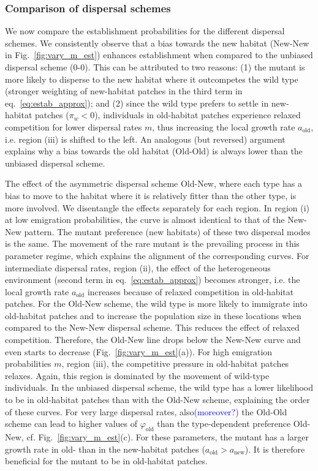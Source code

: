 \documentclass[11pt]{article}
\newcommand{\francois}[1]{\textcolor{blue}{(#1)}}
\newcommand{\chg}[1]{\textcolor{change}{#1}}
\begin{document}
\subsubsection*{Comparison of dispersal schemes}

We now compare the establishment probabilities for the different dispersal schemes. 
We consistently observe that \chg{a bias towards the new habitat (New-New} in Fig.~\ref{fig:vary_m_est}) enhances establishment when compared to the \chg{unbiased} dispersal scheme (0-0). This can be attributed to two reasons: (1) the mutant is more likely to disperse to the new habitat where it outcompetes the wild type (stronger weighting of new-habitat patches in the third term in eq.~\eqref{eq:estab_approx}); and (2) since the wild type prefers to settle in new-habitat patches ($\pi_w<0$), individuals in old-habitat patches experience relaxed competition for lower dispersal rates $m$, thus increasing the local growth rate $a_{\text{old}}$, i.e. region (iii) is shifted to the left. An analogous (but reversed) argument explains why \chg{a bias towards the old habitat (Old-Old}) is always lower than the \chg{unbiased} dispersal scheme. 

The effect of \chg{the asymmetric dispersal scheme Old-New}, where each type has a bias to move to the habitat where it is relatively fitter than the other type, is more involved. We disentangle the effects separately for each region. In region (i) at low emigration probabilities, the curve is almost identical to that of the \chg{New-New} pattern. The mutant preference \chg{(new habitats)} of these two dispersal modes is the same. The movement of the rare mutant is the prevailing process in this parameter regime, which explains the alignment of the \chg{corresponding} curves. 
For intermediate dispersal rates, region (ii), the effect of the heterogeneous environment (second term in eq.~\eqref{eq:estab_approx}) becomes stronger, i.e. the local growth rate $a_{\text{old}}$ increases because of relaxed competition in old-habitat patches. 
For the \chg{Old-New scheme}, the wild type is more likely to immigrate into old-habitat patches and to increase the population size in these locations \chg{when compared to the New-New dispersal scheme}. This reduces the effect of relaxed competition. Therefore, the \chg{Old-New line} drops below the \chg{New-New} curve and even starts to decrease (Fig.~\ref{fig:vary_m_est}(a)). For high emigration probabilities $m$, region (iii), the competitive pressure in old-habitat patches relaxes. Again, this region is dominated by the movement of wild-type individuals. In the \chg{unbiased} dispersal scheme, the wild type has a lower likelihood to be in old-habitat patches than with the \chg{Old-New} scheme, explaining the \chg{order of these} curves. 
For very large dispersal rates, also\francois{moreover?} the \chg{Old-Old} scheme can lead to higher values of $\varphi_{\text{old}}$ than \chg{the type-dependent preference Old-New}, cf. Fig.~\ref{fig:vary_m_est}(c). For these parameters, the mutant has a larger growth rate in old- than in the new-habitat patches ($a_{\text{old}}>a_{\text{new}}$). It is therefore beneficial for the mutant to \chg{be in} old-habitat patches. 
\end{document}
